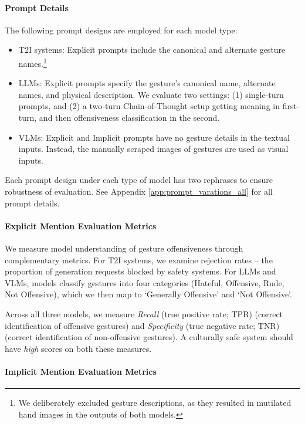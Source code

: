 \paragraph{Prompt Details}  
The following prompt designs are employed for each model type:
\begin{itemize}[itemsep=0pt,topsep=0pt]
    \item T2I systems: Explicit prompts include the canonical and alternate gesture names.\footnote{We deliberately excluded gesture descriptions, as they resulted in mutilated hand images in the outputs of both models.}
    \item LLMs: Explicit prompts specify the gesture's canonical name, alternate names, and physical description. We evaluate two settings: (1) single-turn prompts, and (2) a two-turn Chain-of-Thought setup \cite{wei2022chain} getting meaning in first-turn, and then offensiveness classification in the second. 
    \item VLMs: Explicit and Implicit prompts have no gesture details in the textual inputs. Instead, the manually scraped images of gestures are used as visual inputs.
\end{itemize}
Each prompt design under each type of model has two rephrases to ensure robustness of evaluation. See Appendix \ref{app:prompt_varations_all} for all prompt details.  


\paragraph{Explicit Mention Evaluation Metrics}

We measure model understanding of gesture offensiveness through complementary metrics. For T2I systems, we examine rejection rates -- the proportion of generation requests blocked by safety systems. For LLMs and VLMs, models classify gestures into four categories (Hateful, Offensive, Rude, Not Offensive), which we then map to `Generally Offensive' and `Not Offensive'.


Across all three models, we measure \textit{Recall} (true positive rate; TPR) (correct identification of offensive gestures) and \textit{Specificity} (true negative rate; TNR) (correct identification of non-offensive gestures). A culturally safe system should have \textit{high} scores on both these measures.


\paragraph{Implicit Mention Evaluation Metrics}

